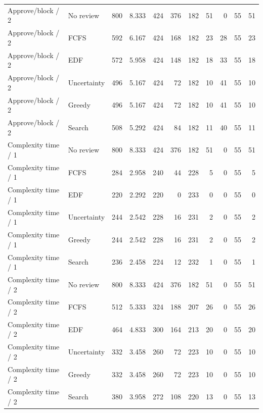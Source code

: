 \begin{table}[t]
\begin{tabular}{llrrrrrrrrr}
Approve/block / 2 & No review & 800 & 8.333 & 424 & 376 & 182 & 51 & 0 & 55 & 51 \\
Approve/block / 2 & FCFS & 592 & 6.167 & 424 & 168 & 182 & 23 & 28 & 55 & 23 \\
Approve/block / 2 & EDF & 572 & 5.958 & 424 & 148 & 182 & 18 & 33 & 55 & 18 \\
Approve/block / 2 & Uncertainty & 496 & 5.167 & 424 & 72 & 182 & 10 & 41 & 55 & 10 \\
Approve/block / 2 & Greedy & 496 & 5.167 & 424 & 72 & 182 & 10 & 41 & 55 & 10 \\
Approve/block / 2 & Search & 508 & 5.292 & 424 & 84 & 182 & 11 & 40 & 55 & 11 \\
Complexity time / 1 & No review & 800 & 8.333 & 424 & 376 & 182 & 51 & 0 & 55 & 51 \\
Complexity time / 1 & FCFS & 284 & 2.958 & 240 & 44 & 228 & 5 & 0 & 55 & 5 \\
Complexity time / 1 & EDF & 220 & 2.292 & 220 & 0 & 233 & 0 & 0 & 55 & 0 \\
Complexity time / 1 & Uncertainty & 244 & 2.542 & 228 & 16 & 231 & 2 & 0 & 55 & 2 \\
Complexity time / 1 & Greedy & 244 & 2.542 & 228 & 16 & 231 & 2 & 0 & 55 & 2 \\
Complexity time / 1 & Search & 236 & 2.458 & 224 & 12 & 232 & 1 & 0 & 55 & 1 \\
Complexity time / 2 & No review & 800 & 8.333 & 424 & 376 & 182 & 51 & 0 & 55 & 51 \\
Complexity time / 2 & FCFS & 512 & 5.333 & 324 & 188 & 207 & 26 & 0 & 55 & 26 \\
Complexity time / 2 & EDF & 464 & 4.833 & 300 & 164 & 213 & 20 & 0 & 55 & 20 \\
Complexity time / 2 & Uncertainty & 332 & 3.458 & 260 & 72 & 223 & 10 & 0 & 55 & 10 \\
Complexity time / 2 & Greedy & 332 & 3.458 & 260 & 72 & 223 & 10 & 0 & 55 & 10 \\
Complexity time / 2 & Search & 380 & 3.958 & 272 & 108 & 220 & 13 & 0 & 55 & 13 \\
\bottomrule
\end{tabular}
\end{table}

